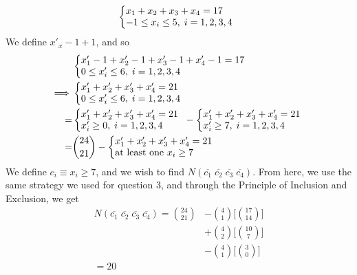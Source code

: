 \documentclass{article}
\begin{document}
\subsection{} %
\begin{equation*}
	\left\{
	\begin{array}{@{}ll@{}}
		x_1+x_2+x_3+x_4=17\\
		-1\le{x_i}\le5,\;i=1,2,3,4
	\end{array}\right.
\end{equation*}
We define $x'_x-1+1$, and so
\begin{align*}
	&\left\{
\begin{array}{@{}ll@{}}
		x'_1-1+x'_2-1+x'_3-1+x'_4-1=17\\
		0\le{x'_i}\le6,\;i=1,2,3,4
	\end{array}\right.\\
	\implies&\left\{
	\begin{array}{@{}ll@{}}
		x'_1+x'_2+x'_3+x'_4=21\\
		0\le{x'_i}\le6,\;i=1,2,3,4
	\end{array}\right.\\
	=&\left\{
	\begin{array}{@{}ll@{}}
		x'_1+x'_2+x'_3+x'_4=21\\
		x'_i\ge0,\;i=1,2,3,4
	\end{array}\right.
	-\left\{
	\begin{array}{@{}ll@{}}
		x'_1+x'_2+x'_3+x'_4=21\\
		x'_i\ge7,\;i=1,2,3,4
	\end{array}\right.\\
	=&\binom{24}{21}
	-\left\{
	\begin{array}{@{}ll@{}}
		x'_1+x'_2+x'_3+x'_4=21\\
		\text{at least one $x_i\ge7$}
	\end{array}\right.
\end{align*}
We define $c_i\equiv{x_i\ge7}$, and we wish to find
$N(\overline{c_1}\;\overline{c_2}\;\overline{c_3}\;\overline{c_4})$. From here,
we use the same strategy we used for question 3, and through the Principle of
Inclusion and Exclusion, we get
\begin{align*}
	N(\overline{c_1}\;\overline{c_2}\;\overline{c_3}\;\overline{c_4})=
	\binom{24}{21}
	&-\binom{4}{1}\bigg[\binom{17}{14}\bigg]\\
	&+\binom{4}{2}\bigg[\binom{10}{7}\bigg]\\
	&-\binom{4}{1}\bigg[\binom{3}{0}\bigg]\\
	=20
\end{align*}
\end{document}
